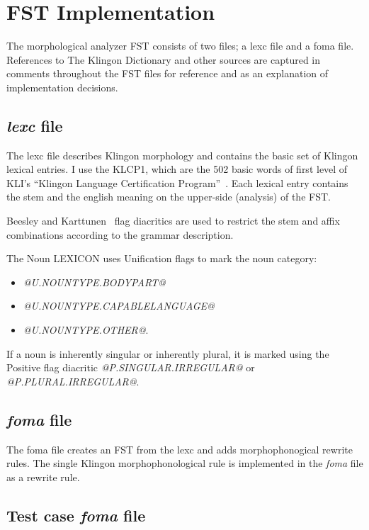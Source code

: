 \documentclass[11pt]{article}
\begin{document}
\section{FST Implementation}

The morphological analyzer FST consists of two files; a lexc file and a foma file. References to The Klingon Dictionary and other sources are captured in comments throughout the FST files for reference and as an explanation of implementation decisions.

\subsection{\textit{lexc} file}

The lexc file describes Klingon morphology and contains the basic set of Klingon lexical entries. I use the KLCP1, which are the 502 basic words of first level of KLI's ``Klingon Language Certification Program''~\cite{Zrajm:12}. Each lexical entry contains the stem and the english meaning on the upper-side (analysis) of the FST.

Beesley and Karttunen~ flag diacritics are used to restrict the stem and affix combinations according to the grammar description.

The Noun LEXICON uses Unification flags to mark the noun category:
\begin{itemize}
	\item \textit{@U.NOUNTYPE.BODYPART@}
	\item \textit{@U.NOUNTYPE.CAPABLELANGUAGE@}
	\item \textit{@U.NOUNTYPE.OTHER@}.
\end{itemize}

If a noun is inherently singular or inherently plural, it is marked using the Positive flag diacritic \textit{@P.SINGULAR.IRREGULAR@} or \textit{@P.PLURAL.IRREGULAR@}.

\subsection{\textit{foma} file}

The foma file creates an FST from the lexc and adds morphophonogical rewrite rules. The single Klingon morphophonological rule is implemented in the \textit{foma} file as a rewrite rule.

\subsection{Test case \textit{foma} file}
\end{document}
